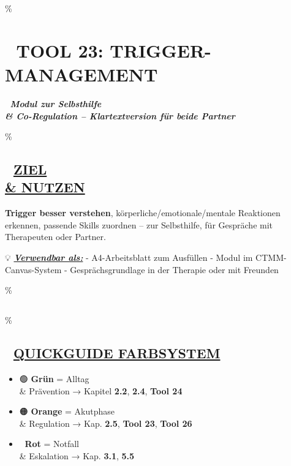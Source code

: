 
\hypertarget{tool-23-trigger-management}{\%
\section{\texorpdfstring{📄 \textbf{TOOL 23: TRIGGER-MANAGEMENT}}{📄 TOOL 23: TRIGGER-MANAGEMENT}}\label{tool-23-trigger-management}}

🧩 \emph{\textbf{Modul zur Selbsthilfe \\\& Co-Regulation -- Klartextversion für beide Partner}}

\hypertarget{ziel-nutzen}{\%
\subsection{\texorpdfstring{🎯 \textbf{\ul{ZIEL \\\& NUTZEN}}}{🎯 ZIEL \\\& NUTZEN}}\label{ziel-nutzen}}

\textbf{Trigger besser verstehen}, körperliche/emotionale/mentale Reaktionen erkennen, passende Skills zuordnen -- zur Selbsthilfe, für Gespräche mit Therapeuten oder Partner.

💡 \emph{\textbf{\ul{Verwendbar als:}}} - A4-Arbeitsblatt zum Ausfüllen - Modul im CTMM-Canvas-System - Gesprächsgrundlage in der Therapie oder mit Freunden

\hypertarget{section}{\%
\subsection{}\label{section}}

\hypertarget{quickguide-farbsystem}{\%
\subsection{\texorpdfstring{🧭 \textbf{\ul{QUICKGUIDE FARBSYSTEM}}}{🧭 QUICKGUIDE FARBSYSTEM}}\label{quickguide-farbsystem}}

\begin{itemize}
\tightlist
\item
  🟢 \textbf{Grün} = Alltag \\\& Prävention → Kapitel \textbf{2.2}, \textbf{2.4}, \textbf{Tool 24}
\item
  🟠 \textbf{Orange} = Akutphase \\\& Regulation → Kap. \textbf{2.5}, \textbf{Tool 23}, \textbf{Tool 26}
\item
  🔴 \textbf{Rot} = Notfall \\\& Eskalation → Kap. \textbf{3.1}, \textbf{5.5}
\end{itemize}

